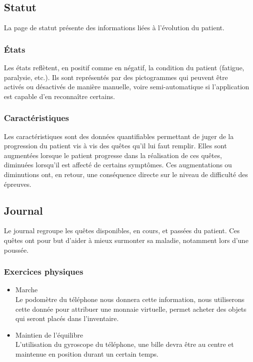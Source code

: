 \documentclass[a4paper,12pt,francais]{article}
\begin{document}
\subsection{Statut}

La page de statut présente des informations liées à l'évolution du patient.

\subsubsection{États}
Les états reflètent, en positif comme en négatif, la condition du patient (fatigue, paralysie, etc.). Ils sont représentés par des pictogrammes qui peuvent être activés ou désactivés de manière manuelle, voire semi-automatique si l'application est capable d'en reconnaître certains.

\subsubsection{Caractéristiques}
Les caractéristiques sont des données quantifiables permettant de juger de la progression du patient vis à vis des quêtes qu'il lui faut remplir. Elles sont augmentées lorsque le patient progresse dans la réalisation de ces quêtes, diminuées lorsqu'il est affecté de certains symptômes. Ces augmentations ou diminutions ont, en retour, une conséquence directe sur le niveau de difficulté des épreuves.

\subsection{Journal}
Le journal regroupe les quêtes disponibles, en cours, et passées du patient. Ces quêtes ont pour but d'aider à mieux surmonter sa maladie, notamment lors d'une poussée.


\subsubsection{Exercices physiques}
\begin{itemize}
	\item Marche\\
		Le podomètre du téléphone nous donnera cette information, nous utiliserons cette donnée pour attribuer une monnaie virtuelle, permet acheter des objets qui seront placés dans l'inventaire.
	\item Maintien de l'équilibre\\
		L'utilisation du gyroscope du téléphone, une bille devra être au centre et maintenue en position durant un certain temps.
\end{itemize}
\end{document}
